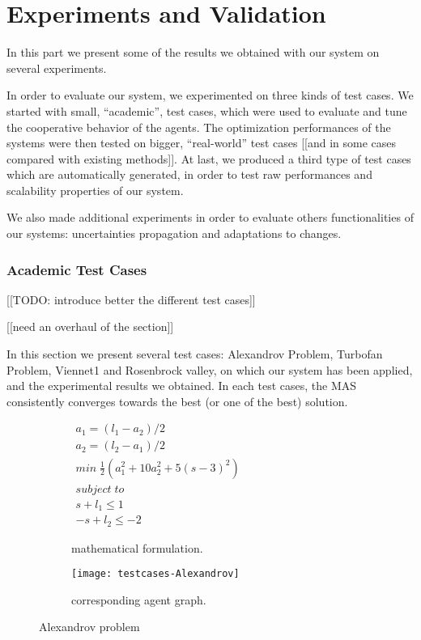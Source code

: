 \part{Experiments and Validation}

In this part we present some of the results we obtained with our system on several experiments.

In order to evaluate our system, we experimented on three kinds of test cases. We started with small, \enquote{academic}, test cases, which were used to evaluate and tune the cooperative behavior of the agents. The optimization performances of the systems were then tested on bigger, \enquote{real-world} test cases [[and in some cases compared with existing methods]]. At last, we produced a third type of test cases which are automatically generated, in order to test raw performances and scalability properties of our system.

We also made additional experiments in order to evaluate others functionalities of our systems: uncertainties propagation and adaptations to changes.

\section{Academic Test Cases}

[[TODO: introduce better the different test cases]]

[[need an overhaul of the section]]

In this section we present several test cases: Alexandrov Problem, Turbofan Problem, Viennet1 and Rosenbrock valley, on which our system has been applied, and the experimental results we obtained. In each test cases, the MAS consistently converges towards the best (or one of the best) solution.

\begin{figure}
\centering
	\begin{subfigure}[b]{0.4\textwidth}
		$\begin{array}{c}
			a_1 = (l_1 - a_2)/2 \\
			a_2 = (l_2 - a_1)/2 \\
			min \; \frac{1}{2}(a_1^2 + 10a_2^2 + 5(s-3)^2) \\
			subject \; to \\
			s + l_1 \leq 1 \\
			-s + l_2 \leq -2
		\end{array}$
		\caption{mathematical formulation.}\label{alexandrov:math}
	\end{subfigure}
	\hfill%
	\begin{subfigure}[b]{0.5\textwidth}
		\texttt{[image: testcases-Alexandrov]}%
		\caption{corresponding agent graph.}\label{alexandrov:graph}
	\end{subfigure}
\caption{Alexandrov problem}\label{alexandrov}
\end{figure}

